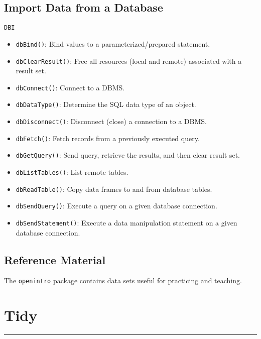 \documentclass[]{book}
\providecommand{\tightlist}{%
  \setlength{\itemsep}{0pt}\setlength{\parskip}{0pt}}
\begin{document}
\hypertarget{import-data-from-a-database}{%
\section{Import Data from a Database}\label{import-data-from-a-database}}

\texttt{DBI}

\begin{itemize}
\tightlist
\item
  \texttt{dbBind()}: Bind values to a parameterized/prepared statement.
\item
  \texttt{dbClearResult()}: Free all resources (local and remote) associated with a result set.
\item
  \texttt{dbConnect()}: Connect to a DBMS.
\item
  \texttt{dbDataType()}: Determine the SQL data type of an object.
\item
  \texttt{dbDisconnect()}: Disconnect (close) a connection to a DBMS.
\item
  \texttt{dbFetch()}: Fetch records from a previously executed query.
\item
  \texttt{dbGetQuery()}: Send query, retrieve the results, and then clear result set.
\item
  \texttt{dbListTables()}: List remote tables.
\item
  \texttt{dbReadTable()}: Copy data frames to and from database tables.
\item
  \texttt{dbSendQuery()}: Execute a query on a given database connection.
\item
  \texttt{dbSendStatement()}: Execute a data manipulation statement on a given database connection.
\end{itemize}

\hypertarget{reference-material}{%
\section{Reference Material}\label{reference-material}}

The \texttt{openintro} package contains data sets useful for practicing and teaching.

\hypertarget{tidy}{%
\chapter{Tidy}\label{tidy}}

\begin{center}\rule{0.5\linewidth}{\linethickness}\end{center}
\end{document}
